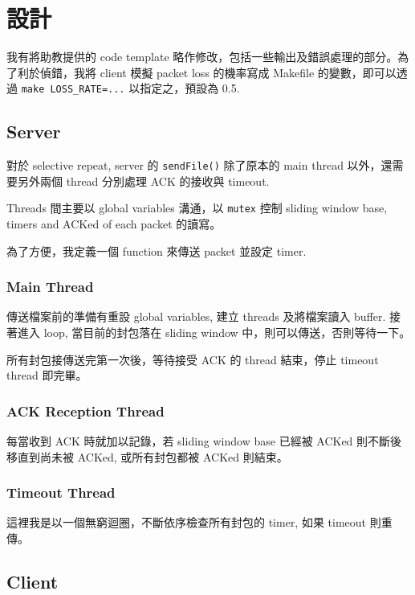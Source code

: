 \documentclass[12pt, a4paper]{article}
\begin{document}
\section{設計}

我有將助教提供的 code template 略作修改，包括一些輸出及錯誤處理的部分。為了利於偵錯，我將 client 模擬 packet loss 的機率寫成 Makefile 的變數，即可以透過 \texttt{make LOSS\_RATE=...} 以指定之，預設為 0.5.

\subsection{Server}

對於 selective repeat, server 的 \texttt{sendFile()} 除了原本的 main thread 以外，還需要另外兩個 thread 分別處理 ACK 的接收與 timeout.

Threads 間主要以 global variables 溝通，以 \texttt{mutex} 控制 sliding window base, timers and ACKed of each packet 的讀寫。

為了方便，我定義一個 function 來傳送 packet 並設定 timer.

\subsubsection{Main Thread}

傳送檔案前的準備有重設 global variables, 建立 threads 及將檔案讀入 buffer. 接著進入 loop, 當目前的封包落在 sliding window 中，則可以傳送，否則等待一下。

所有封包接傳送完第一次後，等待接受 ACK 的 thread 結束，停止 timeout thread 即完畢。

\subsubsection{ACK Reception Thread}

每當收到 ACK 時就加以記錄，若 sliding window base 已經被 ACKed 則不斷後移直到尚未被 ACKed, 或所有封包都被 ACKed 則結束。

\subsubsection{Timeout Thread}

這裡我是以一個無窮迴圈，不斷依序檢查所有封包的 timer, 如果 timeout 則重傳。

\subsection{Client}
\end{document}
